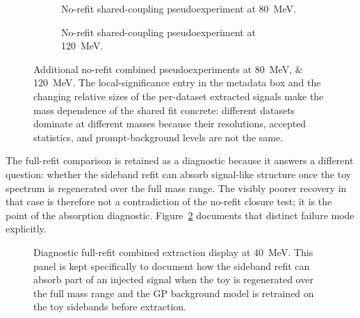 \begin{figure}[p]
\centering
\begin{subfigure}[t]{0.88\linewidth}
  \centering
  \caption{No-refit shared-coupling pseudoexperiment at \SI{80}{MeV}.}
\end{subfigure}

\vspace{0.8em}

\begin{subfigure}[t]{0.88\linewidth}
  \centering
  \caption{No-refit shared-coupling pseudoexperiment at \SI{120}{MeV}.}
\end{subfigure}
\caption{Additional no-refit combined pseudoexperiments at \SIlist{80;120}{MeV}. The
local-significance entry in the metadata box and the changing relative sizes of the
per-dataset extracted signals make the mass dependence of the shared fit concrete:
different datasets dominate at different masses because their resolutions, accepted
statistics, and prompt-background levels are not the same.}
\label{fig:combined-extract-displays-additional}
\end{figure}

The full-refit comparison is retained as a diagnostic because it answers a different
question: whether the sideband refit can absorb signal-like structure once the toy
spectrum is regenerated over the full mass range. The visibly poorer recovery in that
case is therefore not a contradiction of the no-refit closure test; it is the point of
the absorption diagnostic. Figure~\ref{fig:combined-extract-displays-refit} documents
that distinct failure mode explicitly.

\begin{figure}[p]
\centering
{}
\caption{Diagnostic full-refit combined extraction display at \SI{40}{MeV}. This panel
is kept specifically to document how the sideband refit can absorb part of an injected
signal when the toy is regenerated over the full mass range and the GP background model
is retrained on the toy sidebands before extraction.}
\label{fig:combined-extract-displays-refit}
\end{figure}
